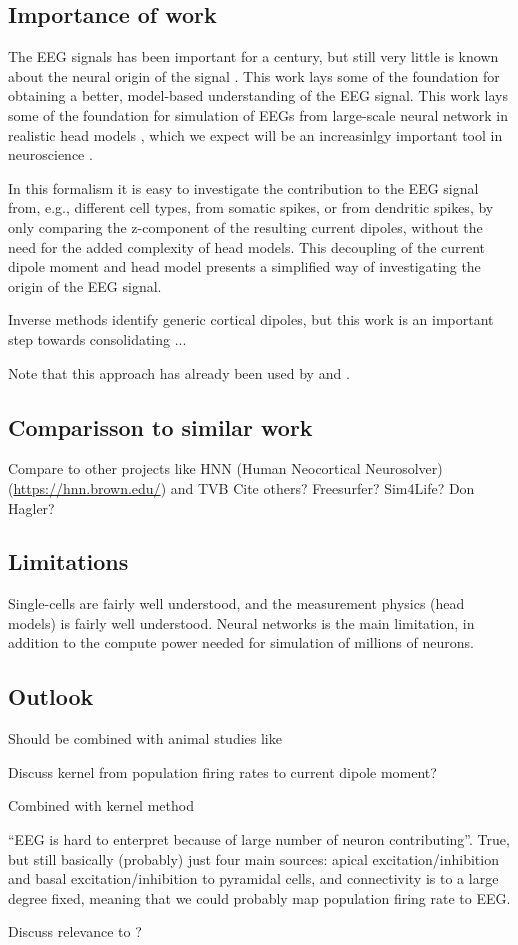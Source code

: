 \documentclass[preprint,10pt,authoryear]{elsarticle}
\newcommand{\tvntxt}[1]{{\color{Emerald}#1}}
\begin{document}
\tvntxt{
\subsection*{Importance of work}
The EEG signals has been important for a century, but still very little is known about the neural origin of the signal \citep{COHEN2017}. This work lays some of the foundation for obtaining a better, model-based understanding of the EEG signal. 
This work lays some of the foundation for simulation of EEGs from large-scale neural network in realistic head models \citep{MARKRAM2015, BILLEH2019}, which we expect will be an increasinlgy important tool in neuroscience \citep{EINEVOLL2019}.

In this formalism it is easy to investigate the contribution to the EEG signal from, e.g., different cell types, from somatic spikes, or from dendritic spikes, by only comparing the z-component of the resulting current dipoles, without the need for the added complexity of head models. This decoupling of the current dipole moment and head model presents a simplified way of investigating the origin of the EEG signal.

Inverse methods identify generic cortical dipoles, but this work is an important step towards consolidating ...

Note that this approach has already been used by \cite{HAGEN2018} and \cite{Maki-Marttunen2019}.

}
\tvntxt{
\subsection*{Comparisson to similar work}
Compare to other projects like HNN (Human Neocortical Neurosolver) (\url{https://hnn.brown.edu/}) and TVB \citep{TVB}
Cite others? Freesurfer? Sim4Life? Don Hagler? 
}

\tvntxt{
\subsection*{Limitations}

Single-cells are fairly well understood, and the measurement physics (head models) is fairly well understood. Neural networks is the main limitation, in addition to the compute power needed for simulation of millions of neurons. 
}

\tvntxt{
\subsection*{Outlook}
Should be combined with animal studies like \cite{BRUYNS2017}

Discuss kernel from population firing rates to current dipole moment?

Combined with kernel method

``EEG is hard to enterpret because of large number of neuron contributing''. True, but still basically (probably) just four main sources: apical excitation/inhibition and basal excitation/inhibition to pyramidal cells, and connectivity is to a large degree fixed, meaning that we could probably map population firing rate to EEG.

Discuss relevance to \cite{MAKI2019}?
}
\end{document}
